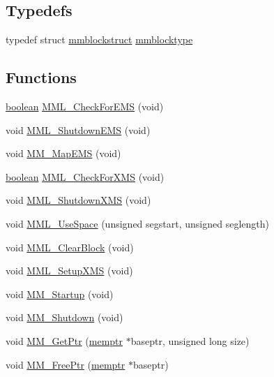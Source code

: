 \subsection*{Typedefs}
\begin{DoxyCompactItemize}
\item 
typedef struct \hyperlink{structmmblockstruct}{mmblockstruct} \hyperlink{ID__MM_8C_aba8d0fc620c14641ef8c8087c2b3f154}{mmblocktype}
\end{DoxyCompactItemize}
\subsection*{Functions}
\begin{DoxyCompactItemize}
\item 
\hyperlink{ID__HEAD_8H_a7c6368b321bd9acd0149b030bb8275ed}{boolean} \hyperlink{ID__MM_8C_a3d0cc007e353ee4e2524ce8130f88a04}{MML\_\-CheckForEMS} (void)
\item 
void \hyperlink{ID__MM_8C_a90282750bde00d338d4b0c2e68afc907}{MML\_\-ShutdownEMS} (void)
\item 
void \hyperlink{ID__MM_8C_a20e7b852401a185c1f4fca0efbb3758d}{MM\_\-MapEMS} (void)
\item 
\hyperlink{ID__HEAD_8H_a7c6368b321bd9acd0149b030bb8275ed}{boolean} \hyperlink{ID__MM_8C_ab77139f5a70f190511309c251f116a5b}{MML\_\-CheckForXMS} (void)
\item 
void \hyperlink{ID__MM_8C_ab34f4240c62f16e618c5827c9696c5d5}{MML\_\-ShutdownXMS} (void)
\item 
void \hyperlink{ID__MM_8C_abf7ebac49c519babe994fbe8bb070d04}{MML\_\-UseSpace} (unsigned segstart, unsigned seglength)
\item 
void \hyperlink{ID__MM_8C_a5a89f418ab9c8e24a72f2bd014f042bc}{MML\_\-ClearBlock} (void)
\item 
void \hyperlink{ID__MM_8C_a942a00587dd60a98e4b34a244edb2ca2}{MML\_\-SetupXMS} (void)
\item 
void \hyperlink{ID__MM_8C_aba99c48e5510e09666eee49955206aad}{MM\_\-Startup} (void)
\item 
void \hyperlink{ID__MM_8C_a11098a9c2f07a2b9ebda237a659b0ef3}{MM\_\-Shutdown} (void)
\item 
void \hyperlink{ID__MM_8C_ab70f353278bae916507eb350c39f4ebb}{MM\_\-GetPtr} (\hyperlink{ID__MM_8H_a04062decc7eb282b066c65e9137bb9bf}{memptr} $\ast$baseptr, unsigned long size)
\item 
void \hyperlink{ID__MM_8C_a9464693cb68e9a8ed7586855952f197a}{MM\_\-FreePtr} (\hyperlink{ID__MM_8H_a04062decc7eb282b066c65e9137bb9bf}{memptr} $\ast$baseptr)

\end{DoxyCompactItemize}

